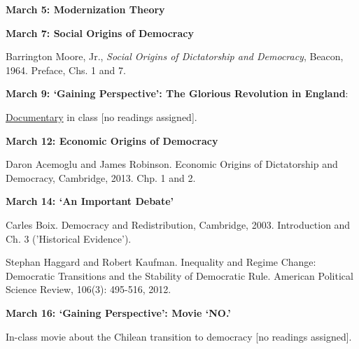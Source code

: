 \documentclass[letterpaper]{article}
\renewenvironment{itemize}{
  \begin{list}{}{
    \setlength{\leftmargin}{1.5em}
  }
}{
  \end{list}
}
\begin{document}
\begin{enumerate}
\begin{itemize} {\bf March 5: Modernization Theory}
		\item {\bf March 7: Social Origins of Democracy}
				\begin{itemize}
					\item[$\bullet$] Barrington Moore, Jr., \emph{Social Origins of Dictatorship and Democracy}, Beacon, 1964. Preface, Chs. 1 and 7.
				\end{itemize}

		\item {\bf March 9: `Gaining Perspective': The Glorious Revolution in England}:
				\begin{itemize}
					\item[$\bullet$] \href{https://www.youtube.com/watch?v=_m0VG01w6lU}{Documentary} in class [no readings assigned].
				\end{itemize}

		\item {\bf March 12: Economic Origins of Democracy}
 				\begin{itemize}
					\item[$\bullet$] Daron Acemoglu and James Robinson. Economic Origins of Dictatorship and Democracy, Cambridge, 2013. Chp. 1 and 2.
				\end{itemize}

		\item {\bf March 14: `An Important Debate'}
 				\begin{itemize}
					\item[$\bullet$] Carles Boix. Democracy and Redistribution, Cambridge, 2003. Introduction and Ch. 3 ('Historical Evidence').
					\item[$\bullet$] Stephan Haggard and Robert Kaufman. Inequality and Regime Change: Democratic Transitions and the Stability of Democratic Rule. American Political Science Review, 106(3): 495-516, 2012.
				\end{itemize}

		\item {\bf March 16: `Gaining Perspective': Movie `NO.'}
 				\begin{itemize}
					\item[$\bullet$] In-class movie about the Chilean transition to democracy [no readings assigned].
				\end{itemize}

	\end{itemize}





\end{enumerate}
\end{document}
